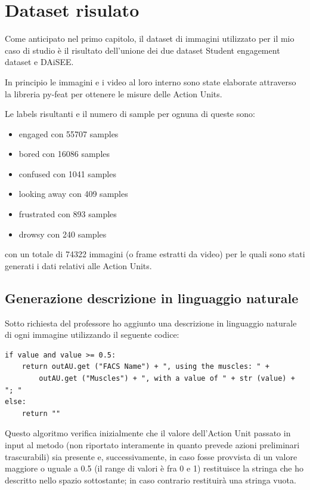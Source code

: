 \chapter{Dataset risulato}
Come anticipato nel primo capitolo, il dataset di immagini utilizzato per il mio caso di studio è il risultato dell’unione dei due dataset Student engagement dataset\cite{StudEngagDataset} e DAiSEE\cite{DAiSEE}.

In principio le immagini e i video al loro interno sono state elaborate attraverso la libreria py-feat per ottenere le misure delle Action Units.

Le labels risultanti e il numero di sample per ognuna di queste sono:
\begin{itemize}
\item engaged con 55707 samples
\item bored con 16086 samples
\item confused con 1041 samples
\item looking away con 409 samples
\item frustrated con 893 samples
\item drowsy con 240 samples
\end{itemize}

con un totale di 74322 immagini (o frame estratti da video) per le quali sono stati generati i dati relativi alle Action Units.

\section{Generazione descrizione in linguaggio naturale}
Sotto richiesta del professore ho aggiunto una descrizione in linguaggio naturale di ogni immagine utilizzando il seguente codice:

\begin{verbatim}
if value and value >= 0.5:
    return outAU.get ("FACS Name") + ", using the muscles: " + 
        outAU.get ("Muscles") + ", with a value of " + str (value) + "; "
else:
    return ""
\end{verbatim}
Questo algoritmo verifica inizialmente che il valore dell’Action Unit passato in input al metodo (non riportato interamente in quanto prevede azioni preliminari trascurabili) sia presente e, successivamente, in caso fosse provvista di un valore maggiore o uguale a 0.5 (il range di valori è fra 0 e 1) restituisce la stringa che ho descritto nello spazio sottostante; in caso contrario restituirà una stringa vuota.

